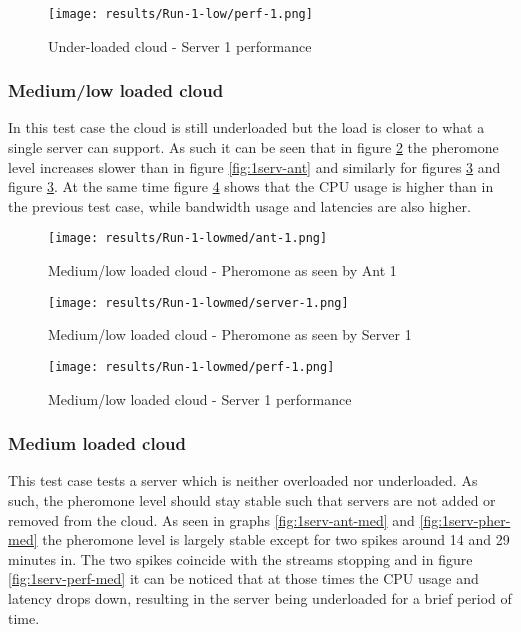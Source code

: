 \begin{figure}
	\centering
		\texttt{[image: results/Run-1-low/perf-1.png]}
	\caption{Under-loaded cloud - Server 1 performance}
	\label{fig:1serv-perf}
\end{figure}

\subsubsection{Medium/low loaded cloud}

In this test case the cloud is still underloaded but the load is closer to what a single server can support. As such it can be seen that in figure \ref{fig:1serv-ant-lowmed} the pheromone level increases slower than in figure \ref{fig:1serv-ant} and similarly for figures \ref{fig:1serv-pher-lowmed} and figure \ref{fig:1serv-pher-lowmed}. At the same time figure  \ref{fig:1serv-perf-lowmed} shows that the CPU usage is higher than in the previous test case, while bandwidth usage and latencies are also higher.

\begin{figure}[!ht]
	\centering
		\texttt{[image: results/Run-1-lowmed/ant-1.png]}
	\caption{Medium/low loaded cloud - Pheromone as seen by Ant 1}
	\label{fig:1serv-ant-lowmed}
\end{figure}

\begin{figure}
	\centering
		\texttt{[image: results/Run-1-lowmed/server-1.png]}
	\caption{Medium/low loaded cloud - Pheromone as seen by Server 1}
	\label{fig:1serv-pher-lowmed}
\end{figure}

\begin{figure}
	\centering
		\texttt{[image: results/Run-1-lowmed/perf-1.png]}
	\caption{Medium/low loaded cloud - Server 1 performance}
	\label{fig:1serv-perf-lowmed}
\end{figure}

\subsubsection{Medium loaded cloud}

This test case tests a server which is neither overloaded nor underloaded. As such, the pheromone level should stay stable such that servers are not added or removed from the cloud. As seen in graphs \ref{fig:1serv-ant-med} and \ref{fig:1serv-pher-med} the pheromone level is largely stable except for two spikes around 14 and 29 minutes in. The two spikes coincide with the streams stopping and in figure \ref{fig:1serv-perf-med} it can be noticed that at those times the CPU usage and latency drops down, resulting in the server being underloaded for a brief period of time.

